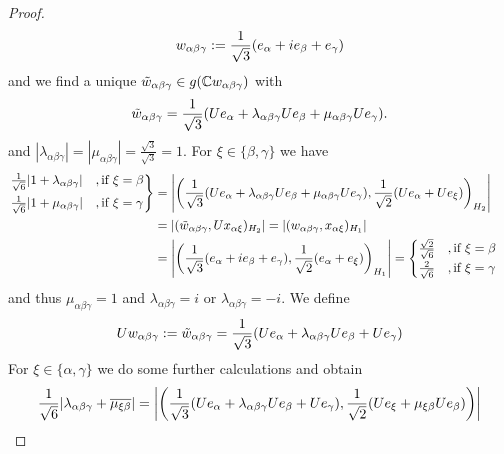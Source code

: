 \begin{proof}
	\begin{align*}
		w_{\alpha \beta \gamma} := \frac{1}{\sqrt{3}} {\left ( e_\alpha + ie_\beta + e_\gamma \right )}
	\end{align*}
	and we find a unique $\tilde{w}_{\alpha \beta \gamma} \in g(\mathbb{C} w_{\alpha \beta \gamma})$ with
	\begin{align*}
		\tilde{w}_{\alpha \beta \gamma} = \frac{1}{\sqrt{3}} {\left ( Ue_\alpha + \lambda_{\alpha \beta \gamma} Ue_\beta + \mu_{\alpha \beta \gamma} Ue_\gamma \right )}.
	\end{align*}
	and $|\lambda_{\alpha \beta \gamma}| = |\mu_{\alpha \beta \gamma}| = \frac{\sqrt{3}}{\sqrt{3}} = 1$. For $\xi \in \{\beta, \gamma\}$ we have
	\begin{align*}
		\begin{rcases}
			\frac{1}{\sqrt{6}} |1 + \lambda_{\alpha \beta \gamma}| &, \text{if } \xi = \beta \\
			\frac{1}{\sqrt{6}} |1 + \mu_{\alpha \beta \gamma}| &, \text{if } \xi = \gamma
		\end{rcases}
		&= {\left | {\left ( \frac{1}{\sqrt{3}} {\left ( Ue_\alpha + \lambda_{\alpha \beta \gamma} Ue_\beta + \mu_{\alpha \beta \gamma} Ue_\gamma \right )}, \frac{1}{\sqrt{2}} (Ue_\alpha + Ue_\xi) \right )}_{H_2} \right |} \\
		&= {\left | (\tilde{w}_{\alpha \beta \gamma}, Ux_{\alpha \xi})_{H_2} \right |} = {\left | (w_{\alpha \beta \gamma}, x_{\alpha \xi})_{H_1} \right |} \\
		&= {\left | {\left ( \frac{1}{\sqrt{3}} {\left ( e_\alpha + ie_\beta + e_\gamma \right )}, \frac{1}{\sqrt{2}} (e_\alpha + e_\xi) \right )}_{H_1} \right |} = 
		\begin{cases}
			\frac{\sqrt{2}}{\sqrt{6}} &, \text{if } \xi = \beta \\
			\frac{2}{\sqrt{6}} &, \text{if } \xi = \gamma
		\end{cases}
	\end{align*}
	and thus $\mu_{\alpha \beta \gamma} = 1$ and $\lambda_{\alpha \beta \gamma} = i$ or $\lambda_{\alpha \beta \gamma} = -i$. We define
	\begin{align*}
		Uw_{\alpha \beta \gamma} := \tilde{w}_{\alpha \beta \gamma} = \frac{1}{\sqrt{3}} {\left ( Ue_\alpha + \lambda_{\alpha \beta \gamma} Ue_\beta + Ue_\gamma \right )}
	\end{align*}
	For $\xi \in \{\alpha, \gamma\}$ we do some further calculations and obtain
	\begin{align}
		\frac{1}{\sqrt{6}}\vbraces{\lambda_{\alpha \beta \gamma} + \overline{\mu_{\xi \beta}}}&= \vbraces{\pbraces{\frac{1}{\sqrt{3}} \pbraces{Ue_\alpha + \lambda_{\alpha \beta \gamma} Ue_\beta + Ue_\gamma}, \frac{1}{\sqrt{2}}(Ue_\xi + \mu_{\xi \beta} Ue_\beta)}} \\

\end{align}
\end{proof}
